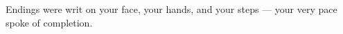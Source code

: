\documentclass[11pt]{memoir}
\begin{document}
  \begin{paracol}{2}
  \begin{leftcolumn}
  
  \end{leftcolumn}
  \end{paracol}

  \null
  \vfill
  \begin{center}
    Endings were writ on your face, your hands, and your steps --- your very pace spoke of completion.
  \end{center}
  \vfill
  \newpage

  \backmatter
  \pagestyle{empty}
  
\end{document}
